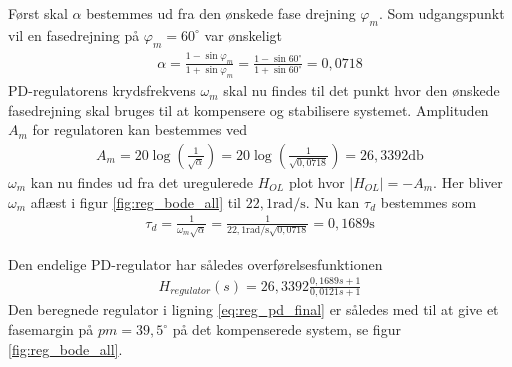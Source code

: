 Først skal $\alpha$ bestemmes ud fra den ønskede fase drejning $\varphi_m$. Som udgangspunkt vil en fasedrejning på $\varphi_m = 60^{\circ}$ var ønskeligt \cite[s. 278]{Reg2015}
\begin{align}
\alpha = \frac{1 - \sin{\varphi_m}}{1 + \sin{\varphi_m}} = \frac{1 - \sin{60^{\circ}}}{1 + \sin{60^{\circ}}} = 0,0718
\end{align}
PD-regulatorens krydsfrekvens $\omega_m$ skal nu findes til det punkt hvor den ønskede fasedrejning skal bruges til at kompensere og stabilisere systemet.
Amplituden $A_m$ for regulatoren kan bestemmes ved \cite[s. 277, fig. 6.21]{Reg2015}
\begin{align}
A_m = 20 \log \left(\frac{1}{\sqrt{\alpha}}\right) =  20 \log \left(\frac{1}{\sqrt{0,0718}}\right) = 26,3392 \si{\decibel}
\end{align}
$\omega_m$ kan nu findes ud fra det uregulerede $H_{OL}$ plot hvor $|H_{OL}| = -A_m$.
Her bliver $\omega_m$ aflæst i figur \ref{fig:reg_bode_all} til $22,1 \si{\radian\per\second}$. 
Nu kan $\tau_d$ bestemmes som \cite[s. 279, (6.13)]{Reg2015}
\begin{align}
\tau_d = \frac{1}{\omega_m\sqrt{\alpha}} = \frac{1}{22,1 \si{\radian\per\second}\sqrt{0,0718}} = 0,1689 \si{\second}
\end{align}

Den endelige PD-regulator har således overførelsesfunktionen
\begin{align}
H_{regulator}(s) = 26,3392 \frac{0,1689 s + 1}{0,0121 s + 1}  \label{eq:reg_pd_final}
\end{align}	
Den beregnede regulator i ligning \ref{eq:reg_pd_final} er således med til at give et fasemargin på $pm=39,5^{\circ}$ på det kompenserede system, se figur \ref{fig:reg_bode_all}.

